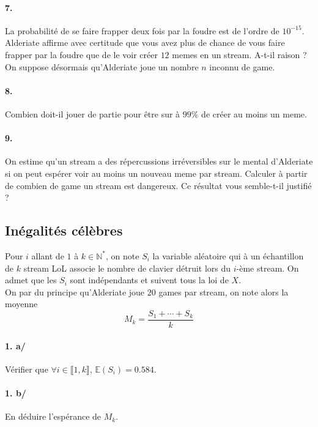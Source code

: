 		\paragraph{7.} La probabilité de se faire frapper deux fois par la foudre est de l'ordre de $10^{-15}$. Alderiate affirme avec certitude que vous avez plus de chance de vous faire frapper par la foudre que de le  voir créer $12$ memes en un stream. A-t-il raison ? \\
		 
		On suppose désormais qu'Alderiate joue un nombre $n$ inconnu de game.
		 
		\paragraph{8.} Combien doit-il jouer de partie pour être sur à $99\%$ de créer au moins un meme.
		 
		\paragraph{9.} On estime qu'un stream a des répercussions irréversibles sur le mental d'Alderiate si on peut espérer voir au moins un nouveau meme par stream. Calculer à partir de combien de game un stream est dangereux. Ce résultat vous semble-t-il justifié ?
		 
		 
		\subsection{Inégalités célèbres}
		 
		Pour $i$ allant de $1$ à $k\in \mathbb{N}^*$, on note $S_i$ la variable aléatoire qui à un échantillon de $k$ stream LoL associe le nombre de clavier détruit lors du $i$-ème stream. On admet que les $S_i$ sont indépendants et suivent tous la loi de $X$.\\
		  
		On par du principe qu'Alderiate joue $20$ games par stream, on note alors la moyenne 
		\[
		  	M_k = \frac{S_1 + \cdots + S_k}{k}
		\]
		  
		\paragraph{1. a/} Vérifier que $\forall i \in \llbracket 1,k \rrbracket$, $\mathbb{E}(S_i) = 0.584$.
		  
		\paragraph{1. b/} En déduire l'espérance de $M_k$.
		  
